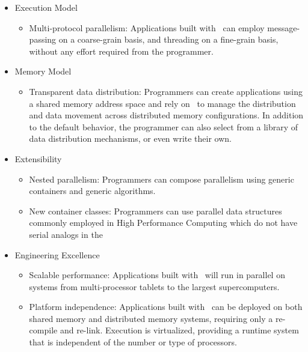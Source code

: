 \documentclass{report}
\begin{document}
\begin{itemize}

\item Execution Model
\begin{itemize}
\item Multi-protocol parallelism:
\newline
Applications built with \stapl\ can employ message-passing on a coarse-grain
basis, and threading on a fine-grain basis, without any effort required
from the programmer.
\end{itemize}

\item Memory Model
\begin{itemize}
\item Transparent data distribution:
Programmers can create applications using a shared memory address space and
rely on \stapl\ to manage the distribution and data movement across distributed
memory configurations.  In addition to the default behavior, the programmer
can also select from a library of data distribution mechanisms, or even write
their own.
\newline
\end{itemize}

\item Extensibility
\begin{itemize}
\item Nested parallelism:
\newline
Programmers can compose parallelism using generic containers
and generic algorithms.
\item New container classes:
\newline
Programmers can use parallel data structures commonly employed in High Performance Computing which do not have serial analogs in the \stl\
\end{itemize}

\item Engineering Excellence
\begin{itemize}
\item Scalable performance:
\newline
Applications built with \stapl\ will run in parallel on systems from
multi-processor tablets to the largest supercomputers.
\item Platform independence:
\newline
Applications built with \stapl\ can be deployed on both shared memory and distributed memory systems, requiring only a re-compile and re-link.  Execution is virtualized, providing a runtime system that is independent of the number or type of processors.
\end{itemize}

\end{itemize}
\end{document}
